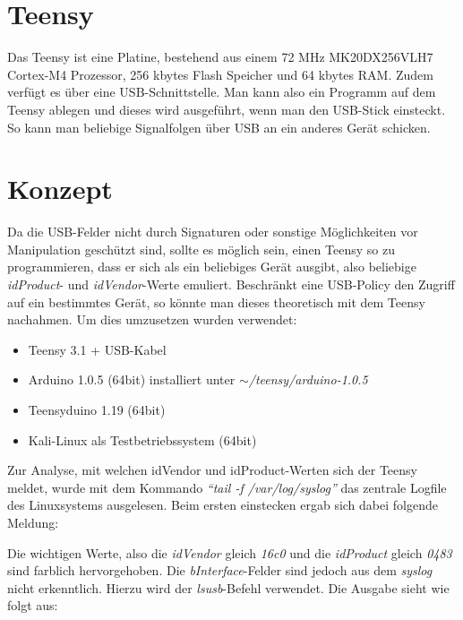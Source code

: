 \section{Teensy}
Das Teensy ist eine Platine, bestehend aus einem 72 MHz MK20DX256VLH7 Cortex-M4 Prozessor, 256 kbytes Flash Speicher und 64 kbytes RAM. Zudem verfügt es über eine USB-Schnittstelle. Man kann also ein Programm auf dem Teensy ablegen und dieses wird ausgeführt, wenn man den USB-Stick einsteckt. So kann man beliebige Signalfolgen über USB an ein anderes Gerät schicken.
			
\section{Konzept}
Da die USB-Felder nicht durch Signaturen oder sonstige Möglichkeiten vor Manipulation geschützt sind, sollte es möglich sein, einen Teensy so zu programmieren, dass er sich als ein beliebiges Gerät ausgibt, also beliebige \textit{idProduct}- und \textit{idVendor}-Werte emuliert. Beschränkt eine USB-Policy den Zugriff auf ein bestimmtes Gerät, so könnte man dieses theoretisch mit dem Teensy nachahmen.
Um dies umzusetzen wurden verwendet:

\begin{itemize}
	\item Teensy 3.1 + USB-Kabel
	\item Arduino 1.0.5 (64bit) installiert unter \textit{$\sim$/teensy/arduino-1.0.5}
	\item Teensyduino 1.19 (64bit)
	\item Kali-Linux als Testbetriebssystem (64bit)
\end{itemize}

Zur Analyse, mit welchen idVendor und idProduct-Werten sich der Teensy meldet, wurde mit dem Kommando \textit{"`tail -f /var/log/syslog"'} das zentrale Logfile des Linuxsystems ausgelesen. Beim ersten einstecken ergab sich dabei folgende Meldung:

\lstset{language=log}


Die wichtigen Werte, also die \textit{idVendor} gleich \textit{16c0} und die \textit{idProduct} gleich \textit{0483} sind farblich hervorgehoben. Die \textit{bInterface}-Felder sind jedoch aus dem \textit{syslog} nicht erkenntlich. Hierzu wird der \textit{lsusb}-Befehl verwendet. Die Ausgabe sieht wie folgt aus:



